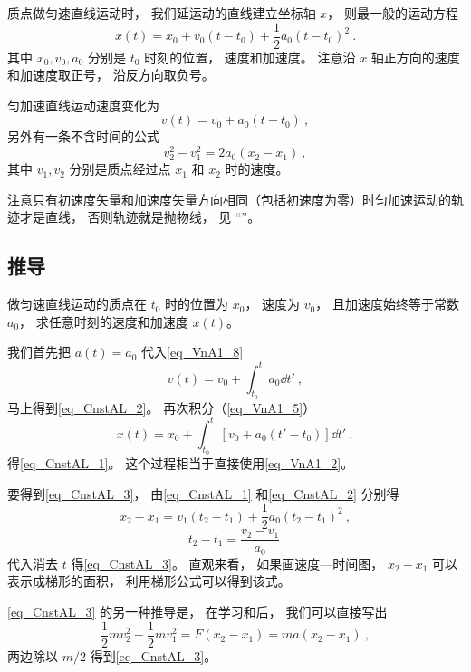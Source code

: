 

质点做匀速直线运动时， 我们延运动的直线建立坐标轴 $x$， 则最一般的运动方程
\begin{equation}\label{eq_CnstAL_1}
x(t) = x_0 + v_0 (t - t_0) +  \frac12 a_0 (t - t_0)^2~.
\end{equation}
其中 $x_0, v_0, a_0$ 分别是 $t_0$ 时刻的位置， 速度和加速度。 注意沿 $x$ 轴正方向的速度和加速度取正号， 沿反方向取负号。

匀加速直线运动速度变化为
\begin{equation}\label{eq_CnstAL_2}
v(t) = v_0 + a_0 (t - t_0)~,
\end{equation}
另外有一条不含时间的公式
\begin{equation}\label{eq_CnstAL_3}
v_2^2 - v_1^2 = 2a_0 (x_2 - x_1)~,
\end{equation}
其中 $v_1, v_2$ 分别是质点经过点 $x_1$ 和 $x_2$ 时的速度。

注意只有初速度矢量和加速度矢量方向相同（包括初速度为零）时匀加速运动的轨迹才是直线， 否则轨迹就是抛物线， 见 “”。

\subsection{推导}
做匀速直线运动的质点在 $t_0$ 时的位置为 $x_0$， 速度为 $v_0$， 且加速度始终等于常数 $a_0$， 求任意时刻的速度和加速度 $x(t)$。

我们首先把 $a(t) = a_0$ 代入\autoref{eq_VnA1_8} 
\begin{equation}
v(t) = v_0 + \int_{t_0}^t a_0 \dd{t'}~,
\end{equation}
马上得到\autoref{eq_CnstAL_2}。 再次积分（\autoref{eq_VnA1_5}）
\begin{equation}
x(t) = x_0 + \int_{t_0}^t [v_0 + a_0 (t' - t_0)] \dd{t'}~,
\end{equation}
得\autoref{eq_CnstAL_1}。 这个过程相当于直接使用\autoref{eq_VnA1_2}。

要得到\autoref{eq_CnstAL_3}， 由\autoref{eq_CnstAL_1} 和\autoref{eq_CnstAL_2} 分别得
\begin{equation}
x_2 - x_1 = v_1 (t_2 - t_1) +  \frac12 a_0 (t_2 - t_1)^2~,
\end{equation}
\begin{equation}
t_2 - t_1 = \frac{v_2 - v_1}{a_0}~
\end{equation}
代入消去 $t$ 得\autoref{eq_CnstAL_3}。 直观来看， 如果画速度—时间图， $x_2 - x_1$ 可以表示成梯形的面积， 利用梯形公式可以得到该式。

\autoref{eq_CnstAL_3} 的另一种推导是， 在学习和后， 我们可以直接写出
\begin{equation}
\frac{1}{2}mv_2^2 - \frac{1}{2}mv_1^2 = F (x_2 - x_1) = ma (x_2 - x_1)~,
\end{equation}
两边除以 $m/2$ 得到\autoref{eq_CnstAL_3}。
